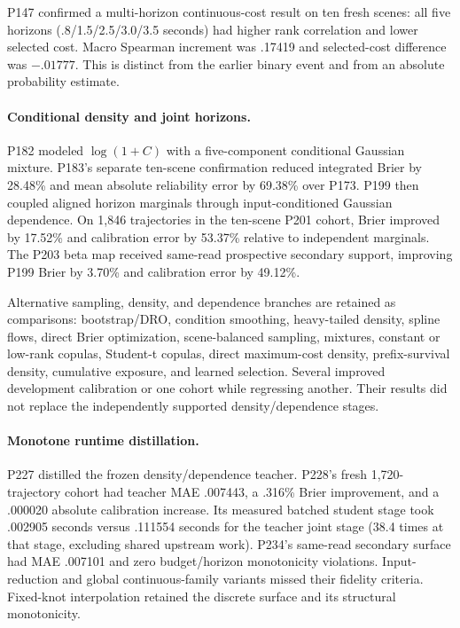 P147 confirmed a multi-horizon continuous-cost result on ten fresh scenes:
all five horizons (.8/1.5/2.5/3.0/3.5 seconds) had higher rank correlation and lower selected cost.
Macro Spearman increment was .17419 and selected-cost difference was $-.01777$.
This is distinct from the earlier binary event and from an absolute probability estimate.

\paragraph{Conditional density and joint horizons.}
P182 modeled $\log(1+C)$ with a five-component conditional Gaussian mixture.
P183's separate ten-scene confirmation reduced integrated Brier by 28.48\% and mean absolute
reliability error by 69.38\% over P173.
P199 then coupled aligned horizon marginals through input-conditioned Gaussian dependence.
On 1,846 trajectories in the ten-scene P201 cohort, Brier improved by 17.52\% and calibration error
by 53.37\% relative to independent marginals.
The P203 beta map received same-read prospective secondary support, improving P199 Brier by 3.70\%
and calibration error by 49.12\%.

Alternative sampling, density, and dependence branches are retained as comparisons:
bootstrap/DRO, condition smoothing, heavy-tailed density, spline flows, direct Brier optimization,
scene-balanced sampling, mixtures, constant or low-rank copulas, Student-t copulas, direct maximum-cost
density, prefix-survival density, cumulative exposure, and learned selection.
Several improved development calibration or one cohort while regressing another.
Their results did not replace the independently supported density/dependence stages.

\paragraph{Monotone runtime distillation.}
P227 distilled the frozen density/dependence teacher.
P228's fresh 1,720-trajectory cohort had teacher MAE .007443, a .316\% Brier improvement,
and a .000020 absolute calibration increase.
Its measured batched student stage took .002905 seconds versus .111554 seconds for the teacher joint stage
(38.4 times at that stage, excluding shared upstream work).
P234's same-read secondary surface had MAE .007101 and zero budget/horizon monotonicity violations.
Input-reduction and global continuous-family variants missed their fidelity criteria.
Fixed-knot interpolation retained the discrete surface and its structural monotonicity.

